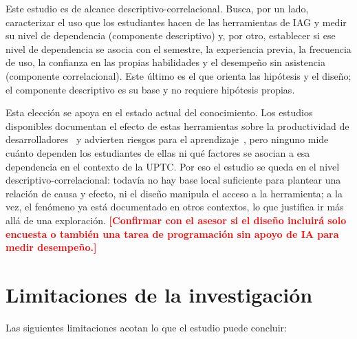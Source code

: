 \documentclass[12pt,a4paper,oneside]{report}
\newcommand{\pendiente}[1]{\textcolor{red}{\textbf{[#1]}}}
\begin{document}
Este estudio es de alcance descriptivo-correlacional. Busca, por un lado, caracterizar el uso que los estudiantes hacen de las herramientas de IAG y medir su nivel de dependencia (componente descriptivo) y, por otro, establecer si ese nivel de dependencia se asocia con el semestre, la experiencia previa, la frecuencia de uso, la confianza en las propias habilidades y el desempeño sin asistencia (componente correlacional). Este último es el que orienta las hipótesis y el diseño; el componente descriptivo es su base y no requiere hipótesis propias.

Esta elección se apoya en el estado actual del conocimiento. Los estudios disponibles documentan el efecto de estas herramientas sobre la productividad de desarrolladores~\cite{peng2023,ziegler2022} y advierten riesgos para el aprendizaje~\cite{prather2023,martinovic2024,ieee2024}, pero ninguno mide cuánto dependen los estudiantes de ellas ni qué factores se asocian a esa dependencia en el contexto de la UPTC. Por eso el estudio se queda en el nivel descriptivo-correlacional: todavía no hay base local suficiente para plantear una relación de causa y efecto, ni el diseño manipula el acceso a la herramienta; a la vez, el fenómeno ya está documentado en otros contextos, lo que justifica ir más allá de una exploración. \pendiente{Confirmar con el asesor si el diseño incluirá solo encuesta o también una tarea de programación sin apoyo de IA para medir desempeño.}

\section{Limitaciones de la investigación}

Las siguientes limitaciones acotan lo que el estudio puede concluir:
\end{document}
